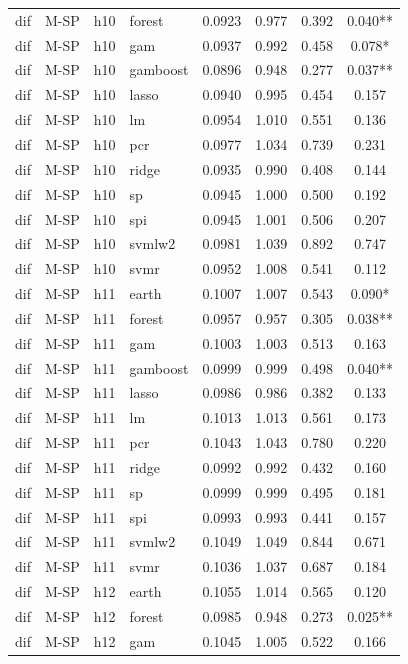 \begin{ThreePartTable}
\begin{longtable}[t]{llclcccc}
dif & M-SP & h10 & forest & 0.0923 & 0.977 & 0.392 & 0.040**\\
dif & M-SP & h10 & gam & 0.0937 & 0.992 & 0.458 & 0.078*\\
dif & M-SP & h10 & gamboost & 0.0896 & 0.948 & 0.277 & 0.037**\\
dif & M-SP & h10 & lasso & 0.0940 & 0.995 & 0.454 & 0.157\\
dif & M-SP & h10 & lm & 0.0954 & 1.010 & 0.551 & 0.136\\
dif & M-SP & h10 & pcr & 0.0977 & 1.034 & 0.739 & 0.231\\
dif & M-SP & h10 & ridge & 0.0935 & 0.990 & 0.408 & 0.144\\
dif & M-SP & h10 & sp & 0.0945 & 1.000 & 0.500 & 0.192\\
dif & M-SP & h10 & spi & 0.0945 & 1.001 & 0.506 & 0.207\\
dif & M-SP & h10 & svmlw2 & 0.0981 & 1.039 & 0.892 & 0.747\\
dif & M-SP & h10 & svmr & 0.0952 & 1.008 & 0.541 & 0.112\\
\addlinespace
dif & M-SP & h11 & earth & 0.1007 & 1.007 & 0.543 & 0.090*\\
dif & M-SP & h11 & forest & 0.0957 & 0.957 & 0.305 & 0.038**\\
dif & M-SP & h11 & gam & 0.1003 & 1.003 & 0.513 & 0.163\\
dif & M-SP & h11 & gamboost & 0.0999 & 0.999 & 0.498 & 0.040**\\
dif & M-SP & h11 & lasso & 0.0986 & 0.986 & 0.382 & 0.133\\
dif & M-SP & h11 & lm & 0.1013 & 1.013 & 0.561 & 0.173\\
dif & M-SP & h11 & pcr & 0.1043 & 1.043 & 0.780 & 0.220\\
dif & M-SP & h11 & ridge & 0.0992 & 0.992 & 0.432 & 0.160\\
dif & M-SP & h11 & sp & 0.0999 & 0.999 & 0.495 & 0.181\\
dif & M-SP & h11 & spi & 0.0993 & 0.993 & 0.441 & 0.157\\
dif & M-SP & h11 & svmlw2 & 0.1049 & 1.049 & 0.844 & 0.671\\
dif & M-SP & h11 & svmr & 0.1036 & 1.037 & 0.687 & 0.184\\
\addlinespace
dif & M-SP & h12 & earth & 0.1055 & 1.014 & 0.565 & 0.120\\
dif & M-SP & h12 & forest & 0.0985 & 0.948 & 0.273 & 0.025**\\
dif & M-SP & h12 & gam & 0.1045 & 1.005 & 0.522 & 0.166\\

\end{longtable}
\end{ThreePartTable}

